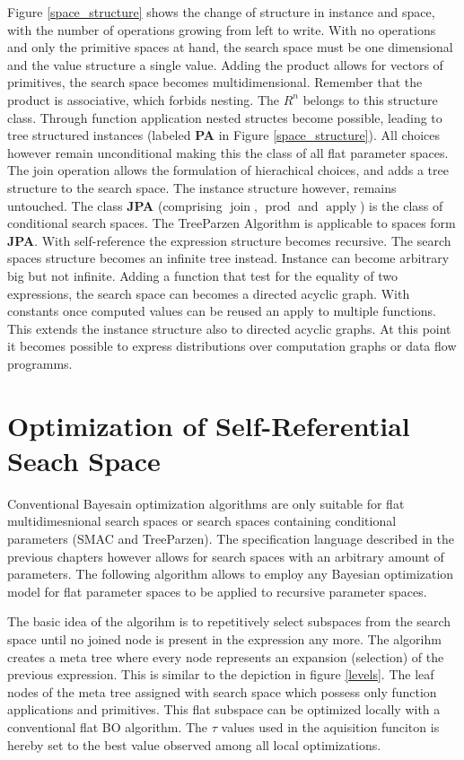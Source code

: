 \documentclass[english]{article}
\newcommand{\join}{\operatorname{join}}
\newcommand{\apply}{\operatorname{apply}}
\newcommand{\prot}{\operatorname{prod}}
\begin{document}
Figure \ref{space_structure} shows the change of structure in instance and space, with the number of operations growing from left to write.
With no operations and only the primitive spaces at hand, the search space must be one dimensional and the value structure a single value.
Adding the product allows for vectors of primitives, the search space becomes multidimensional. Remember that the product is associative, which forbids nesting. The $R^n$ belongs to this structure class.
Through function application nested structes become possible, leading to tree structured instances (labeled \textbf{PA} in Figure \ref{space_structure}). All choices however remain unconditional making this the class of all flat parameter spaces.
The join operation allows the formulation of hierachical choices, and adds a tree structure to the search space. The instance structure however, remains untouched.
The class \textbf{JPA} (comprising $\join$, $\prot$ and $\apply$) is the class of conditional search spaces. The TreeParzen Algorithm is applicable to spaces form \textbf{JPA}.
With self-reference the expression structure becomes recursive. The search spaces structure becomes an infinite tree instead. Instance can become arbitrary big but not infinite.
Adding a function that test for the equality of two expressions, the search space can becomes a directed acyclic graph.
With constants once computed values can be reused an apply to multiple functions. This extends the instance structure also to directed acyclic graphs. At this point it becomes possible to express distributions over computation graphs or data flow programms.




\section{Optimization of Self-Referential Seach Space}
Conventional Bayesain optimization algorithms are only suitable for flat multidimesnional search spaces or search spaces containing conditional parameters (SMAC and TreeParzen). The specification language described in the previous chapters however allows for search spaces with an arbitrary amount of parameters. The following algorithm allows to employ any Bayesian optimization model for flat parameter spaces to be applied to recursive parameter spaces.

The basic idea of the algorihm is to repetitively select subspaces from the search space until no joined node is present in the expression any more. The algorihm creates a meta tree where every node represents an expansion (selection) of the previous expression. This is similar to the depiction in figure \ref{levels}. The leaf nodes of the meta tree assigned with search space which possess only function applications and primitives. This flat subspace can be optimized locally with a conventional flat BO algorithm. The $\tau$ values used in the aquisition funciton is hereby set to the best value observed among all local optimizations.
\end{document}
